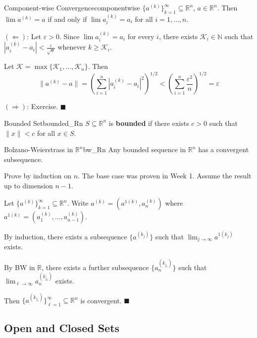 \documentclass[11pt, letterpaper, openany]{book}
\renewenvironment{proof}[1][\proofname]{%
  \tcolorbox[blanker, breakable, left=1em,
    before skip=1em, after skip=1em,
    borderline west={2pt}{0pt}{MagicTeal!50},
    colback=MagicCream,
    before upper={\textcolor{MagicTeal}{\sffamily\bfseries #1.}\space}
  ]%
}{%
  \hfill\textcolor{MagicTeal}{\ensuremath{\blacksquare}}\endtcolorbox%
}
\begin{document}
\begin{lem}{Component-wise Convergence}{componentwise}
$\{a^{(k)}\}_{k=1}^\infty \subseteq \mathbb{R}^n$, $a \in \mathbb{R}^n$. Then $\lim a^{(k)} = a$ if and only if $\lim a_i^{(k)} = a_i$ for all $i = 1, \ldots, n$.
\end{lem}

\begin{proof}
$(\Leftarrow)$: Let $\varepsilon > 0$. Since $\lim a_i^{(k)} = a_i$ for every $i$, there exists $\mathcal{K}_i \in \mathbb{N}$ such that $|a_i^{(k)} - a_i| < \frac{\varepsilon}{\sqrt{n}}$ whenever $k \geq \mathcal{K}_i$.

Let $\mathcal{K} = \max\{\mathcal{K}_1, \ldots, \mathcal{K}_n\}$. Then
\[\|a^{(k)} - a\| = \left(\sum_{i=1}^n |a_i^{(k)} - a_i|^2\right)^{1/2} < \left(\sum_{i=1}^n \frac{\varepsilon^2}{n}\right)^{1/2} = \varepsilon\]

$(\Rightarrow)$: Exercise.
\end{proof}

\begin{defn}{Bounded Set}{bounded_Rn}
$S \subseteq \mathbb{R}^n$ is \textbf{bounded} if there exists $c > 0$ such that $\|x\| < c$ for all $x \in S$.
\end{defn}

\begin{thm}{Bolzano-Weierstrass in $\mathbb{R}^n$}{bw_Rn}
Any bounded sequence in $\mathbb{R}^n$ has a convergent subsequence.
\end{thm}

\begin{proof}[Sketch]
Prove by induction on $n$. The base case was proven in Week 1. Assume the result up to dimension $n-1$.

Let $\{a^{(k)}\}_{k=1}^\infty \subseteq \mathbb{R}^n$. Write $a^{(k)} = (a^{1(k)}, a_n^{(k)})$ where $a^{1(k)} = (a_1^{(k)}, \ldots, a_{n-1}^{(k)})$.

By induction, there exists a subsequence $\{a^{(k_j)}\}$ such that $\lim_{j\to\infty} a^{1(k_j)}$ exists.

By BW in $\mathbb{R}$, there exists a further subsequence $\{a_n^{(k_{j_\ell})}\}$ such that $\lim_{\ell\to\infty} a_n^{(k_{j_\ell})}$ exists.

Then $\{a^{(k_{j_\ell})}\}_{\ell=1}^\infty \subseteq \mathbb{R}^n$ is convergent.
\end{proof}

\subsection{Open and Closed Sets}
\end{document}
